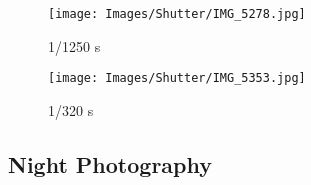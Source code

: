 \begin{figure}[htb]
	\begin{minipage}{.5\textwidth}
		\texttt{[image: Images/Shutter/IMG\_5278.jpg]}
		\caption{1/1250 s}
		\label{fig:IMG_5278}
	\end{minipage}
	\begin{minipage}{.5\textwidth}
		\texttt{[image: Images/Shutter/IMG\_5353.jpg]}
		\caption{1/320 s}
		\label{fig:IMG_5353}
	\end{minipage}
\end{figure}


\subsection{Night Photography}

